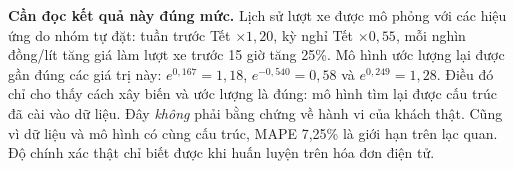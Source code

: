 {\textbf{Cần đọc kết quả này đúng mức.} Lịch sử lượt xe được mô phỏng với các
hiệu ứng do nhóm tự đặt: tuần trước Tết $\times1{,}20$, kỳ nghỉ Tết
$\times0{,}55$, mỗi nghìn đồng/lít tăng giá làm lượt xe trước 15 giờ tăng 25\%.
Mô hình ước lượng lại được gần đúng các giá trị này: $e^{0{,}167}=1{,}18$,
$e^{-0{,}540}=0{,}58$ và $e^{0{,}249}=1{,}28$. Điều đó chỉ cho thấy cách xây
biến và ước lượng là đúng: mô hình tìm lại được cấu trúc đã cài vào dữ liệu.
Đây \emph{không} phải bằng chứng về hành vi của khách thật. Cũng vì dữ liệu và
mô hình có cùng cấu trúc, MAPE 7,25\% là giới hạn trên lạc quan. Độ chính xác
thật chỉ biết được khi huấn luyện trên hóa đơn điện tử.

}

